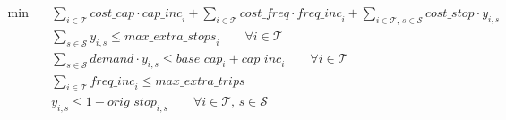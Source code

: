 \begin{align}
  \min\quad & \sum_{i \in \mathcal{T}} \mathit{cost\_cap} \cdot \mathit{cap\_inc}_{i}
            + \sum_{i \in \mathcal{T}} \mathit{cost\_freq} \cdot \mathit{freq\_inc}_{i}
            + \sum_{i \in \mathcal{T},\, s \in \mathcal{S}} \mathit{cost\_stop} \cdot y_{i,s}
            \tag{total\_cost} \\
  & \sum_{s \in \mathcal{S}} y_{i,s} \le \mathit{max\_extra\_stops}_{i}
    \qquad \forall i \in \mathcal{T}
    \tag{stop\_limit} \\
  & \sum_{s \in \mathcal{S}} \mathit{demand} \cdot y_{i,s}
    \le \mathit{base\_cap}_{i} + \mathit{cap\_inc}_{i}
    \qquad \forall i \in \mathcal{T}
    \tag{capacity\_demand} \\
  & \sum_{i \in \mathcal{T}} \mathit{freq\_inc}_{i} \le \mathit{max\_extra\_trips}
    \tag{freq\_limit} \\
  & y_{i,s} \le 1 - \mathit{orig\_stop}_{i,s}
    \qquad \forall i \in \mathcal{T},\, s \in \mathcal{S}
    \tag{no\_orig\_stop}
\end{align}